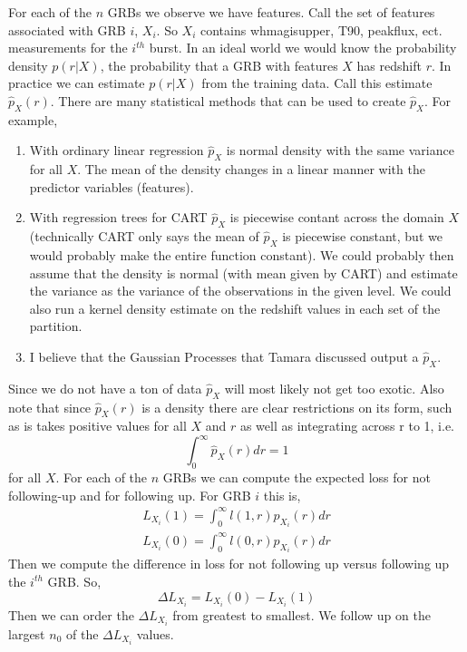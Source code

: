 \documentclass[10pt]{article}
\begin{document}
For each of the $n$ GRBs we observe we have features. Call the set of features associated with GRB $i$, $X_i$. So $X_i$ contains whmagisupper, T90, peakflux, ect. measurements for the $i^{th}$ burst. In an ideal world we would know the probability density $p(r|X)$, the probability that a GRB with features $X$ has redshift $r$. In practice we can estimate $p(r|X)$ from the training data. Call this estimate $\hat{p}_X(r)$. There are many statistical methods that can be used to create $\hat{p}_X$. For example,
\begin{enumerate}
\item With ordinary linear regression $\hat{p}_X$ is normal density with the same variance for all $X$. The mean of the density changes in a linear manner with the predictor variables (features).
\item With regression trees for CART $\hat{p}_X$ is piecewise contant across the domain $X$ (technically CART only says the mean of $\hat{p}_X$ is piecewise constant, but we would probably make the entire function constant). We could probably then assume that the density is normal (with mean given by CART) and estimate the variance as the variance of the observations in the given level. We could also run a kernel density estimate on the redshift values in each set of the partition.
\item I believe that the Gaussian Processes that Tamara discussed output a $\hat{p}_X$. 
\end{enumerate}
Since we do not have a ton of data $\hat{p}_X$ will most likely not get too exotic. Also note that since $\hat{p}_X(r)$ is a density there are clear restrictions on its form, such as is takes positive values for all $X$ and $r$ as well as integrating across r to 1, i.e.
\begin{equation*}
\int_{0}^{\infty} \hat{p}_X(r) dr = 1
\end{equation*}
for all $X$. For each of the $n$ GRBs we can compute the expected loss for not following-up and for following up. For GRB $i$ this is,
\begin{align}
\label{losses} 
L_{X_i}(1) = \int_{0}^{\infty} l(1,r)\hat{p}_{X_i}(r) dr\\
L_{X_i}(0) = \int_{0}^{\infty} l(0,r)\hat{p}_{X_i}(r) dr
\end{align}
Then we compute the difference in loss for not following up versus following up the $i^{th}$ GRB. So,
\begin{equation*}
\Delta L_{X_i} = L_{X_i}(0) - L_{X_i}(1)
\end{equation*}
Then we can order the $\Delta L_{X_i}$ from greatest to smallest. We follow up on the largest $n_0$ of the $\Delta L_{X_i}$ values.
\end{document}
